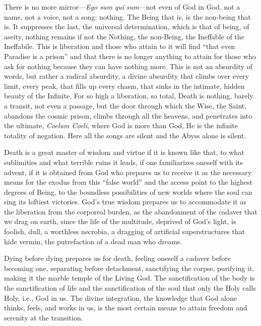 There is no more mirror---\emph{Ego sum qui sum}---not even of God in God, not a name, not a voice, not a song: nothing. The Being that is, is the non-being that is. It suppresses the last, the universal determination, which is that of being, of aseity, nothing remains if not the Nothing, the non-Being, the Ineffable of the Ineffabile. This is liberation and those who attain to it will find ``that even Paradise is a prison'' and that there is no longer anything to attain for those who ask for nothing because they can have nothing more. This is not an absurdity of words, but rather a radical absurdity, a divine absurdity that climbs over every limit, every peak, that fills up every chasm, that sinks in the intimate, hidden beauty of the Infinite. For so high a liberation, so total, Death is nothing, barely a transit, not even a passage, but the door through which the Wise, the Saint, abandons the cosmic prison, climbs through all the heavens, and penetrates into the ultimate, \emph{Coelum Coeli}, where God is more than God, He is the infinite totality of negation. Here all the songs are silent and the Abyss alone is silent.

Death is a great master of wisdom and virtue if it is known like that, to what sublimities and what terrible ruins it leads, if one familiarizes oneself with its advent, if it is obtained from God who prepares us to receive it as the necessary means for the exodus from this ``false world'' and the access point to the highest degrees of Being, to the boundless possibilities of new worlds where the soul can sing its loftiest victories. God's true wisdom prepares us to accommodate it as the liberation from the corporeal burden, as the abandonment of the cadaver that we drag on earth, since the life of the multitude, deprived of God's light, is foolish, dull, a worthless necrobia, a dragging of artificial superstructures that hide vermin, the putrefaction of a dead man who dreams.

Dying before dying prepares us for death, feeling oneself a cadaver before becoming one, separating before detachment, sanctifying the corpse, purifying it, making it the marble temple of the Living God. The sanctification of the body is the sanctification of life and the sanctification of the soul that only the Holy calls Holy, i.e., God in us. The divine integration, the knowledge that God alone thinks, feels, and works in us, is the most certain means to attain freedom and serenity at the transition.

